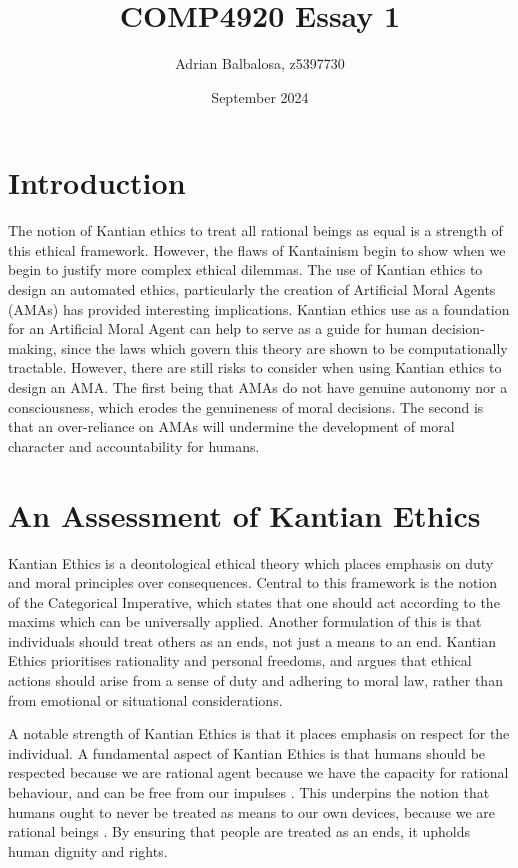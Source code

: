 \documentclass{article}
\title{COMP4920 Essay 1}
\author{Adrian Balbalosa, z5397730}
\date{September 2024}
\begin{document}
\maketitle

\section{Introduction}
The notion of Kantian ethics to treat all rational beings as
equal is a strength of this ethical framework. However, the flaws of Kantainism 
begin to show when we begin to justify more complex ethical dilemmas. The 
use of Kantian ethics to design an automated ethics, particularly the creation of
Artificial Moral Agents (AMAs) has provided interesting implications. Kantian ethics
use as a foundation for an Artificial Moral Agent can help to serve as a guide for human
decision-making, since the laws which govern this theory are shown to be computationally
tractable. However, there are still risks to consider when using Kantian ethics to design 
an AMA. The first being that AMAs do not have genuine autonomy nor a consciousness, which erodes the 
genuineness of moral decisions. The second is that an over-reliance on AMAs will undermine the  
development of moral character and accountability for humans.

\section{An Assessment of Kantian Ethics}
Kantian Ethics is a deontological ethical theory which places emphasis on duty and
moral principles over consequences. Central to this framework is the notion of the
Categorical Imperative, which states that one should act according to the maxims which
can be universally applied. Another formulation of this is that individuals should treat
others as an ends, not just a means to an end. Kantian Ethics prioritises rationality and
personal freedoms, and argues that ethical actions should arise from a sense of duty and
adhering to moral law, rather than from emotional or situational considerations.

A notable strength of Kantian Ethics is that it places emphasis on respect
for the individual. A fundamental aspect of Kantian Ethics is that 
humans should be respected because we are rational agent because we have the 
capacity for rational behaviour, and can be free from our impulses \parencite[p. 77]{bennet2015}.
This underpins the notion that humans ought to never be treated as means to our own devices,
because we are rational beings \parencite[p. 77]{bennet2015}. By ensuring that people are treated as
an ends, it upholds human dignity and rights.
\end{document}

